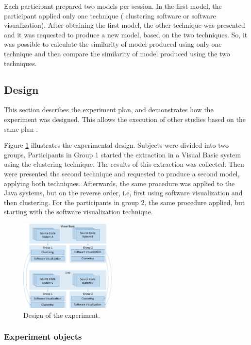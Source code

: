 \documentclass{sig-alternate-05-2015}
\begin{document}
Each participant prepared two models per session. In the first model, the participant applied only one technique 
( clustering software or software visualization). After obtaining the first model, the other technique was presented and 
it was requested to produce a new model, based on the two techniques. So, it was possible to calculate the similarity of model produced using only one 
technique and then compare the similarity of model produced using the two techniques.

\subsection{Design}%

This section describes the experiment plan, and demonstrates how the experiment was designed. This allows the execution of other studies based on the same plan \cite{Juristo_2010}.

Figure \ref{design_experimento} illustrates the experimental design. Subjects were divided into two groups. Participants in Group 1 started the extraction in a Visual Basic system using the clustering technique. The results of this extraction was collected. Then were presented the second technique and requested to produce a second model, applying both techniques. Afterwards, the same procedure was applied to the Java systems, but on the reverse order, i.e, first using software visualization and then clustering. For the participants in group 2, the same procedure applied, but starting with the software visualization technique.

\begin{figure}[!h]
	\centering
	\includegraphics[width=0.43\textwidth]{design_experimento}
	\caption{Design of the experiment.}
	\label{design_experimento}
\end{figure}

\subsubsection{Experiment objects}%
\end{document}
